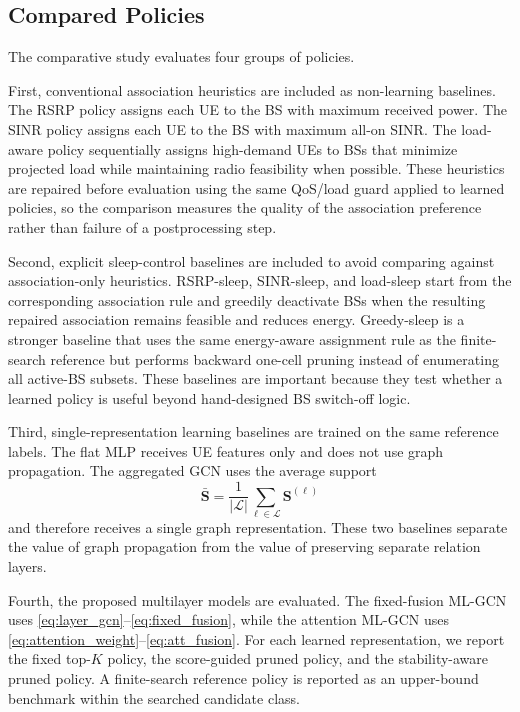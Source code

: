 \documentclass[journal]{IEEEtran}
\begin{document}
\subsection{Compared Policies}
The comparative study evaluates four groups of policies.

First, conventional association heuristics are included as non-learning
baselines. The RSRP policy assigns each UE to the BS with maximum received
power. The SINR policy assigns each UE to the BS with maximum all-on SINR. The
load-aware policy sequentially assigns high-demand UEs to BSs that minimize
projected load while maintaining radio feasibility when possible. These
heuristics are repaired before evaluation using the same QoS/load guard applied
to learned policies, so the comparison measures the quality of the association
preference rather than failure of a postprocessing step.

Second, explicit sleep-control baselines are included to avoid comparing
against association-only heuristics. RSRP-sleep, SINR-sleep, and load-sleep
start from the corresponding association rule and greedily deactivate BSs when
the resulting repaired association remains feasible and reduces energy.
Greedy-sleep is a stronger baseline that uses the same energy-aware assignment
rule as the finite-search reference but performs backward one-cell pruning
instead of enumerating all active-BS subsets. These baselines are important
because they test whether a learned policy is useful beyond hand-designed BS
switch-off logic.

Third, single-representation learning baselines are trained on the same
reference labels. The flat MLP receives UE features only and does not use graph
propagation. The aggregated GCN uses the average support
\begin{equation}
    \bar{\mathbf{S}}=\frac{1}{|\mathcal{L}|}
    \sum_{\ell\in\mathcal{L}}\mathbf{S}^{(\ell)}
\end{equation}
and therefore receives a single graph representation. These two baselines
separate the value of graph propagation from the value of preserving separate
relation layers.

Fourth, the proposed multilayer models are evaluated. The fixed-fusion ML-GCN
uses \eqref{eq:layer_gcn}--\eqref{eq:fixed_fusion}, while the attention ML-GCN
uses \eqref{eq:attention_weight}--\eqref{eq:att_fusion}. For each learned
representation, we report the fixed top-$K$ policy, the score-guided pruned
policy, and the stability-aware pruned policy. A finite-search reference policy
is reported as an upper-bound benchmark within the searched candidate class.
\end{document}

